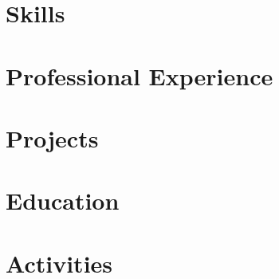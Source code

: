 \documentclass[letter,10pt]{article}
\begin{document}


\section{Skills}


\section{Professional Experience}


\section{Projects}


\section{Education}


\section{Activities}

\end{document}
